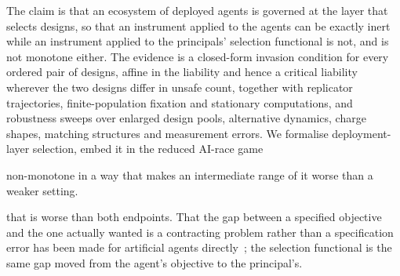 The claim is that an ecosystem of deployed agents is governed at the layer
that selects designs, so that an instrument applied to the agents can be
exactly inert while an instrument applied to the principals' selection
functional is not, and is not monotone either. The evidence is a closed-form
invasion condition for every ordered pair of designs, affine in the liability
and hence a critical liability wherever the two designs differ in unsafe
count, together with replicator trajectories, finite-population fixation and
stationary computations, and robustness sweeps over enlarged design pools,
alternative dynamics, charge shapes, matching structures and measurement
errors.
We formalise deployment-layer selection, embed it in the reduced AI-race game


non-monotone in a way that makes an intermediate range of it worse than a
weaker setting.


that is worse than both endpoints. That the gap between a specified objective
and the one actually wanted is a contracting problem rather than a
specification error has been made for artificial agents
directly~\citep{hadfieldmenell2019incomplete}; the selection functional is the
same gap moved from the agent's objective to the principal's.


